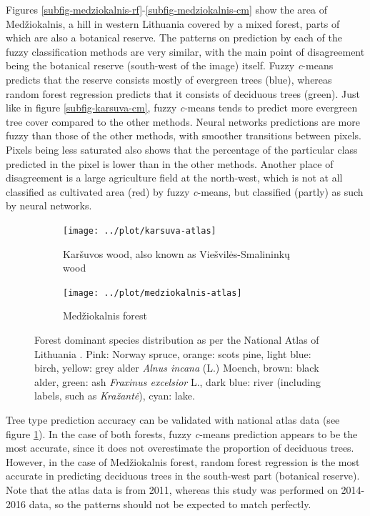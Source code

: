 \documentclass[a4paper,10pt]{book}
\begin{document}
Figures \ref{subfig-medziokalnis-rf}-\ref{subfig-medziokalnis-cm} show the area of Med\v{z}iokalnis, a hill in western Lithuania covered by a mixed forest, parts of which are also a botanical reserve. The patterns on prediction by each of the fuzzy classification methods are very similar, with the main point of disagreement being the botanical reserve (south-west of the image) itself. Fuzzy \textit{c}-means predicts that the reserve consists mostly of evergreen trees (blue), whereas random forest regression predicts that it consists of deciduous trees (green). Just like in figure \ref{subfig-karsuva-cm}, fuzzy \textit{c}-means tends to predict more evergreen tree cover compared to the other methods. Neural networks predictions are more fuzzy than those of the other methods, with smoother transitions between pixels. Pixels being less saturated also shows that the percentage of the particular class predicted in the pixel is lower than in the other methods. Another place of disagreement is a large agriculture field at the north-west, which is not at all classified as cultivated area (red) by fuzzy \textit{c}-means, but classified (partly) as such by neural networks.

\begin{figure}
  \centering
  \begin{subfigure}[b]{0.48\textwidth}
    \texttt{[image: ../plot/karsuva-atlas]}
    \caption{Kar\v{s}uvos wood, also known as Vie\v{s}vil\.{e}s-Smalinink\k{u} wood}
  \end{subfigure} \hfill
  \begin{subfigure}[b]{0.48\textwidth}
    \texttt{[image: ../plot/medziokalnis-atlas]}
    \caption{Med\v{z}iokalnis forest}
  \end{subfigure}
  \caption{Forest dominant species distribution as per the National Atlas of Lithuania \citep{treeatlas2011}. Pink: Norway spruce, orange: scots pine, light blue: birch, yellow: grey alder \textit{Alnus incana} (L.) Moench, brown: black alder, green: ash \textit{Fraxinus excelsior} L., dark blue: river (including labels, such as \textit{Kra\v{z}ant\.{e}}), cyan: lake.}
  \label{fig-atlas-forest}
\end{figure}

Tree type prediction accuracy can be validated with national atlas data (see figure \ref{fig-atlas-forest}). In the case of both forests, fuzzy \textit{c}-means prediction appears to be the most accurate, since it does not overestimate the proportion of deciduous trees. However, in the case of Med\v{z}iokalnis forest, random forest regression is the most accurate in predicting deciduous trees in the south-west part (botanical reserve). Note that the atlas data is from 2011, whereas this study was performed on 2014-2016 data, so the patterns should not be expected to match perfectly.
\end{document}
